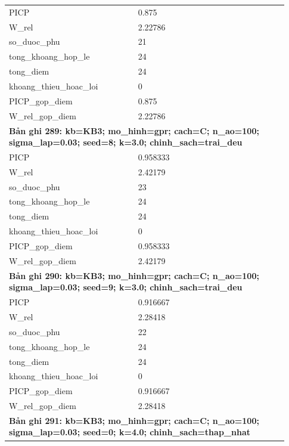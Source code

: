 \begin{longtable}{p{0.43\linewidth}p{0.50\linewidth}}
PICP & 0.875 \\
W\_\allowbreak rel & 2.22786 \\
so\_\allowbreak duoc\_\allowbreak phu & 21 \\
tong\_\allowbreak khoang\_\allowbreak hop\_\allowbreak le & 24 \\
tong\_\allowbreak diem & 24 \\
khoang\_\allowbreak thieu\_\allowbreak hoac\_\allowbreak loi & 0 \\
PICP\_\allowbreak gop\_\allowbreak diem & 0.875 \\
W\_\allowbreak rel\_\allowbreak gop\_\allowbreak diem & 2.22786 \\
\midrule
\multicolumn{2}{p{0.95\linewidth}}{\textbf{Bản ghi 289: kb=KB3; mo\_hinh=gpr; cach=C; n\_ao=100; sigma\_lap=0.03; seed=8; k=3.0; chinh\_sach=trai\_deu}} \\
PICP & 0.958333 \\
W\_\allowbreak rel & 2.42179 \\
so\_\allowbreak duoc\_\allowbreak phu & 23 \\
tong\_\allowbreak khoang\_\allowbreak hop\_\allowbreak le & 24 \\
tong\_\allowbreak diem & 24 \\
khoang\_\allowbreak thieu\_\allowbreak hoac\_\allowbreak loi & 0 \\
PICP\_\allowbreak gop\_\allowbreak diem & 0.958333 \\
W\_\allowbreak rel\_\allowbreak gop\_\allowbreak diem & 2.42179 \\
\midrule
\multicolumn{2}{p{0.95\linewidth}}{\textbf{Bản ghi 290: kb=KB3; mo\_hinh=gpr; cach=C; n\_ao=100; sigma\_lap=0.03; seed=9; k=3.0; chinh\_sach=trai\_deu}} \\
PICP & 0.916667 \\
W\_\allowbreak rel & 2.28418 \\
so\_\allowbreak duoc\_\allowbreak phu & 22 \\
tong\_\allowbreak khoang\_\allowbreak hop\_\allowbreak le & 24 \\
tong\_\allowbreak diem & 24 \\
khoang\_\allowbreak thieu\_\allowbreak hoac\_\allowbreak loi & 0 \\
PICP\_\allowbreak gop\_\allowbreak diem & 0.916667 \\
W\_\allowbreak rel\_\allowbreak gop\_\allowbreak diem & 2.28418 \\
\midrule
\multicolumn{2}{p{0.95\linewidth}}{\textbf{Bản ghi 291: kb=KB3; mo\_hinh=gpr; cach=C; n\_ao=100; sigma\_lap=0.03; seed=0; k=4.0; chinh\_sach=thap\_nhat}} \\

\end{longtable}
